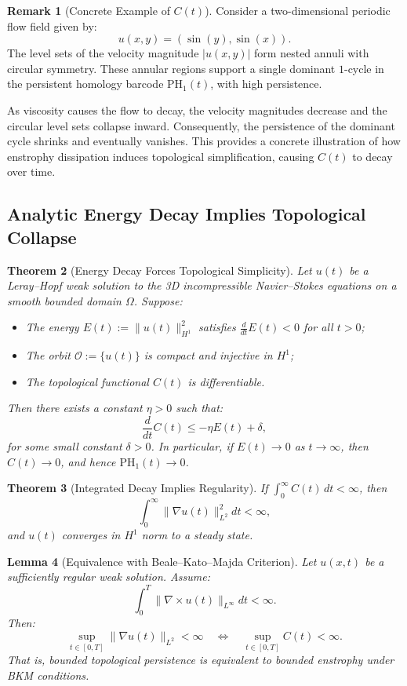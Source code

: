 \documentclass[11pt]{article}
\newtheorem{theorem}{Theorem}[section]
\newtheorem{lemma}[theorem]{Lemma}
\theoremstyle{definition}
\newtheorem{remark}[theorem]{Remark}
\begin{document}
\begin{remark}[Concrete Example of $C(t)$]
Consider a two-dimensional periodic flow field given by:
\[
    u(x, y) = (\sin(y), \sin(x)).
\]
The level sets of the velocity magnitude $|u(x, y)|$ form nested annuli with circular symmetry. These annular regions support a single dominant $1$-cycle in the persistent homology barcode $\mathrm{PH}_1(t)$, with high persistence.

As viscosity causes the flow to decay, the velocity magnitudes decrease and the circular level sets collapse inward. Consequently, the persistence of the dominant cycle shrinks and eventually vanishes. This provides a concrete illustration of how enstrophy dissipation induces topological simplification, causing $C(t)$ to decay over time.
\end{remark}

\subsection{Analytic Energy Decay Implies Topological Collapse}

\begin{theorem}[Energy Decay Forces Topological Simplicity]
\label{thm:energy_topo}
Let $u(t)$ be a Leray--Hopf weak solution to the 3D incompressible Navier--Stokes equations on a smooth bounded domain $\Omega$. Suppose:
\begin{itemize}
    \item The energy $E(t) := \|u(t)\|_{H^1}^2$ satisfies $\frac{d}{dt} E(t) < 0$ for all $t > 0$;
    \item The orbit $\mathcal{O} := \{ u(t) \}$ is compact and injective in $H^1$;
    \item The topological functional $C(t)$ is differentiable.
\end{itemize}
Then there exists a constant $\eta > 0$ such that:
\[
\frac{d}{dt} C(t) \leq -\eta E(t) + \delta,
\]
for some small constant $\delta > 0$. In particular, if $E(t) \to 0$ as $t \to \infty$, then $C(t) \to 0$, and hence $\mathrm{PH}_1(t) \to 0$.
\end{theorem}

\begin{theorem}[Integrated Decay Implies Regularity]
If $\int_0^\infty C(t)\,dt < \infty$, then
\[
\int_0^\infty \|\nabla u(t)\|_{L^2}^2 dt < \infty,
\]
and $u(t)$ converges in $H^1$ norm to a steady state.
\end{theorem}

\begin{lemma}[Equivalence with Beale--Kato--Majda Criterion]
\label{lem:bkm_equiv}
Let $u(x,t)$ be a sufficiently regular weak solution. Assume:
\[
\int_0^T \|\nabla \times u(t)\|_{L^\infty} dt < \infty.
\]
Then:
\[
\sup_{t \in [0,T]} \|\nabla u(t)\|_{L^2} < \infty \quad \Leftrightarrow \quad \sup_{t \in [0,T]} C(t) < \infty.
\]
That is, bounded topological persistence is equivalent to bounded enstrophy under BKM conditions.
\end{lemma}
\end{document}
